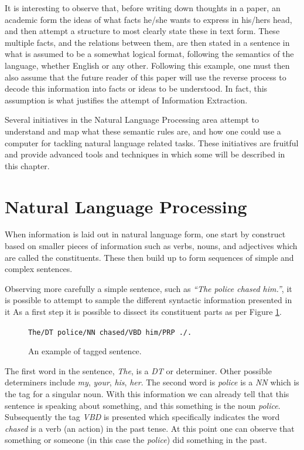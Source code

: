 \documentclass[11pt,a4paper,openright]{memoir}
\begin{document}
It is interesting to observe that, before writing down thoughts in a paper, an academic form the ideas of what facts he/she wants to express in his/hers head, and then attempt a structure to most clearly state these in text form. These multiple facts, and the relations between them, are then stated in a sentence in what is assumed to be a somewhat logical format, following the semantics of the language, whether English or any other. Following this example, one must then also assume that the future reader of this paper will use the reverse process to decode this information into facts or ideas to be understood. In fact, this assumption is what justifies the attempt of Information Extraction.

Several initiatives in the Natural Language Processing area attempt to understand and map what these semantic rules are, and how one could use a computer for tackling natural language related tasks. These initiatives are fruitful and provide advanced tools and techniques in which some will be described in this chapter.


%
%
%
%


\section{Natural Language Processing}

When information is laid out in natural language form, one start by construct based on smaller pieces of information such as verbs, nouns, and adjectives which are called the constituents. These then build up to form sequences of simple and complex sentences.

Observing more carefully a simple sentence, such as \emph{\enquote{The police chased him.}}, it is possible to attempt to sample the different syntactic information presented in it As a first step it is possible to dissect its constituent parts as per Figure \ref{fig:pos_tags}.

\begin{figure}[!htbp]
  \centering
    \texttt{The/DT police/NN chased/VBD him/PRP ./.}
  \caption[An example of tagged sentence.]{An example of tagged sentence.}
  \label{fig:pos_tags}
\end{figure}

The first word in the sentence, \emph{The}, is a \emph{DT} or determiner. Other possible determiners include \emph{my}, \emph{your}, \emph{his}, \emph{her}. The second word is \emph{police} is a \emph{NN} which is the tag for a singular noun. With this information we can already tell that this sentence is speaking about something, and this something is the noun \emph{police}. Subsequently the tag \emph{VBD} is presented which specifically indicates the word \emph{chased} is a verb (an action) in the past tense. At this point one can observe that something or someone (in this case the \emph{police}) did something in the past.
\end{document}
